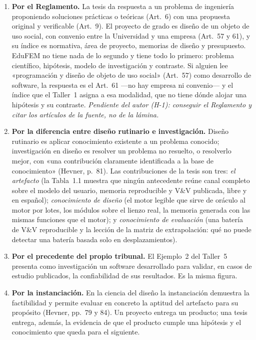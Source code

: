 \documentclass[11pt,a4paper]{article}
\begin{document}
\begin{enumerate}
\item \textbf{Por el Reglamento.} La tesis da respuesta a un problema de ingeniería proponiendo soluciones prácticas o teóricas (Art.~6) con una propuesta original y verificable (Art.~9). El proyecto de grado es diseño de un objeto de uso social, con convenio entre la Universidad y una empresa (Art.~57 y 61), y su índice es normativa, área de proyecto, memorias de diseño y presupuesto. EduFEM no tiene nada de lo segundo y tiene todo lo primero: problema científico, hipótesis, modelo de investigación y contraste. Si alguien lee «programación y diseño de objeto de uso social» (Art.~57) como desarrollo de software, la respuesta es el Art.~61 —no hay empresa ni convenio— y el índice que el Taller~1 asigna a esa modalidad, que no tiene dónde alojar una hipótesis y su contraste. \emph{Pendiente del autor (H-1): conseguir el Reglamento y citar los artículos de la fuente, no de la lámina.}
\item \textbf{Por la diferencia entre diseño rutinario e investigación.} Diseño rutinario es aplicar conocimiento existente a un problema conocido; investigación en diseño es resolver un problema no resuelto, o resolverlo mejor, con «una contribución claramente identificada a la base de conocimiento» (Hevner, p.~81). Las contribuciones de la tesis son tres: \emph{el artefacto} (la Tabla~1.1 muestra que ningún antecedente reúne canal completo sobre el modelo del usuario, memoria reproducible y V\&V publicada, libre y en español); \emph{conocimiento de diseño} (el motor legible que sirve de oráculo al motor por lotes, los módulos sobre el lienzo real, la memoria generada con las mismas funciones que el motor); y \emph{conocimiento de evaluación} (una batería de V\&V reproducible y la lección de la matriz de extrapolación: qué no puede detectar una batería basada solo en desplazamientos).
\item \textbf{Por el precedente del propio tribunal.} El Ejemplo~2 del Taller~5 presenta como investigación un software desarrollado para validar, en casos de estudio publicados, la confiabilidad de sus resultados. Es la misma figura.
\item \textbf{Por la instanciación.} En la ciencia del diseño la instanciación demuestra la factibilidad y permite evaluar en concreto la aptitud del artefacto para su propósito (Hevner, pp.~79 y 84). Un proyecto entrega un producto; una tesis entrega, además, la evidencia de que el producto cumple una hipótesis y el conocimiento que queda para el siguiente.
\end{enumerate}
\end{document}
